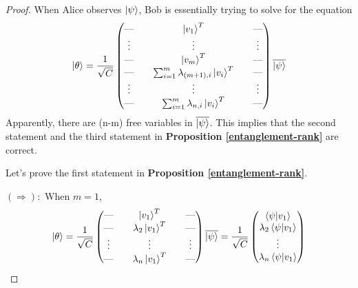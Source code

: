 \begin{proof}
When Alice observes $\ket{\psi}$, Bob is essentially trying to solve for the equation\\
\begin{equation}
\ket{\theta}= \frac{1}{\sqrt{C}}\begin{pmatrix}
\text{---} && \ket{v_1}^T &&\text{---} \\
\vdots && \vdots && \vdots\\
\text{---} && \ket{v_m}^T && \text{---} \\
\text{---} && \sum_{i=1}^m \lambda_{(m+1), i}\ket{v_i}^T  &&\text{---} \\
\vdots && \vdots && \vdots \\
\text{---} && \sum_{i=1}^m \lambda_{n, i}\ket{v_i}^T &&\text{---} \\
\end{pmatrix}\overline{\ket{\psi}}  
\end{equation}
Apparently, there are (n-m) free variables in $\overline{\ket{\psi}}$. This implies that the second statement and the third statement in \textbf{Proposition \ref{entanglement-rank}} are correct.

\bigskip
Let's prove the first statement in \textbf{Proposition \ref{entanglement-rank}}.

$(\Rightarrow):$ When $m=1$, 
\begin{equation}
\ket{\theta}=\frac{1}{\sqrt{C}}\begin{pmatrix}
\text{---} && \ket{v_1}^T &&\text{---} \\
\text{---} && \lambda_2\ket{v_1}^T &&\text{---} \\
\vdots && \vdots && \vdots\\
\text{---} && \lambda_n\ket{v_1}^T &&\text{---} \\
\end{pmatrix}
\overline{\ket{\psi}}\\
=\frac{1}{\sqrt{C}}\begin{pmatrix}
\braket{\psi|v_1}\\
\lambda_2 \braket{\psi|v_1}\\
\vdots\\
\lambda_n \braket{\psi|v_1}
\end{pmatrix}
\end{equation}


\end{proof}
